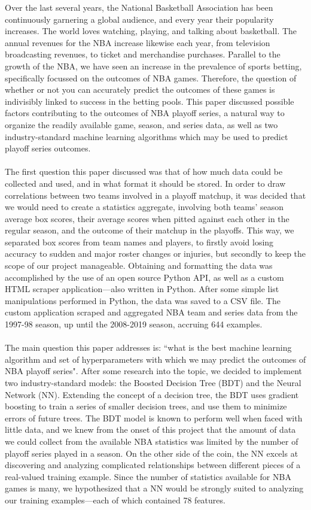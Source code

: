 \documentclass[letterpaper]{article} %
\begin{document}
Over the last several years, the National Basketball Association has been continuously garnering a global audience, and every year their popularity increases. The world loves watching, playing, and talking about basketball. The annual revenues for the NBA increase likewise each year, from television broadcasting revenues, to ticket and merchandise purchases. Parallel to the growth of the NBA, we have seen an increase in the prevalence of sports betting, specifically focussed on the outcomes of NBA games. Therefore, the question of whether or not you can accurately predict the outcomes of these games is indivisibly linked to success in the betting pools. This paper discussed possible factors contributing to the outcomes of NBA playoff series, a natural way to organize the readily available game, season, and series data, as well as two industry-standard machine learning algorithms which may be used to predict playoff series outcomes. \\ \\
The first question this paper discussed was that of how much data could be collected and used, and in what format it should be stored. In order to draw correlations between two teams involved in a playoff matchup, it was decided that we would need to create a statistics aggregate, involving both teams' season average box scores, their average scores when pitted against each other in the regular season, and the outcome of their matchup in the playoffs. This way, we separated box scores from team names and players, to firstly avoid losing accuracy to sudden and major roster changes or injuries, but secondly to keep the scope of our project manageable. Obtaining and formatting the data was accomplished by the use of an open source Python API, as well as a custom HTML scraper application---also written in Python. After some simple list manipulations performed in Python, the data was saved to a CSV file. The custom application scraped and aggregated NBA team and series data from the 1997-98 season, up until the 2008-2019 season, accruing 644 examples. \\ \\ 
The main question this paper addresses is: ``what is the best machine learning algorithm and set of hyperparameters with which we may predict the outcomes of NBA playoff series". After some research into the topic, we decided to implement two industry-standard models: the Boosted Decision Tree (BDT) and the Neural Network (NN). Extending the concept of a decision tree, the BDT uses gradient boosting to train a series of smaller decision trees, and use them to minimize errors of future trees. The BDT model is known to perform well when faced with little data, and we knew from the onset of this project that the amount of data we could collect from the available NBA statistics was limited by the number of playoff series played in a season. On the other side of the coin, the NN excels at discovering and analyzing complicated relationships between different pieces of a real-valued training example. Since the number of statistics available for NBA games is many, we hypothesized that a NN would be strongly suited to analyzing our training examples---each of which contained 78 features. \\ \\
\end{document}
